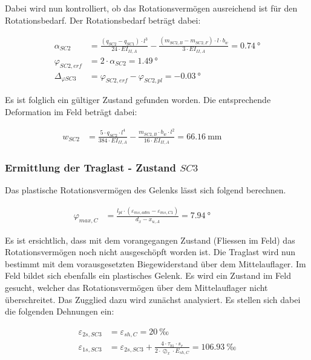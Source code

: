 \documentclass[
  11pt,
  letterpaper,
]{scrreprt}
\begin{document}
Dabei wird nun kontrolliert, ob das Rotationsvermögen ausreichend ist
für den Rotationsbedarf. Der Rotationsbedarf beträgt dabei:

\[
\begin{aligned}
\alpha_{SC2}& = \frac{\left(q_{SC2} - q_{SC1}\right) \cdot l^{3}}{24 \cdot EI_{II , A}} - \frac{\left(m_{SC2 , B} - m_{SC2 , F}\right) \cdot l \cdot b_{w}}{3 \cdot EI_{II , A}} = 0.74 \ \mathrm{°} \\ 
\varphi_{SC2 , erf}& = 2 \cdot \alpha_{SC2} = 1.49 \ \mathrm{°} \\ 
\Delta_{\varphi SC3}& = \varphi_{SC2 , erf} - \varphi_{SC2 , pl} = -0.03 \ \mathrm{°} \end{aligned}
\]

Es ist folglich ein gültiger Zustand gefunden worden. Die entsprechende
Deformation im Feld beträgt dabei:

\[
\begin{aligned}
w_{SC2}& = \frac{5 \cdot q_{SC2} \cdot l^{4}}{384 \cdot EI_{II , A}} - \frac{m_{SC2 , B} \cdot b_{w} \cdot l^{2}}{16 \cdot EI_{II , A}} = 66.16 \ \mathrm{mm} \quad &  \quad &  
 \end{aligned}
\]

\subsubsection{\texorpdfstring{Ermittlung der Traglast - Zustand
\(SC3\)}{Ermittlung der Traglast - Zustand SC3}}\label{ermittlung-der-traglast---zustand-sc3}

Das plastische Rotationsvermögen des Gelenks lässt sich folgend
berechnen.

\[
\begin{aligned}
\varphi_{max , C}& = \frac{l_{pl} \cdot \left(\varepsilon_{m s , adm} - \varepsilon_{m s , C1}\right)}{d_{x} - x_{u , A}} = 7.94 \ \mathrm{°} \quad &  \quad &  
 \end{aligned}
\]

Es ist ersichtlich, dass mit dem vorangegangen Zustand (Fliessen im
Feld) das Rotationsvermögen noch nicht ausgeschöpft worden ist. Die
Traglast wird nun bestimmt mit dem vorausgesetzten Biegewiderstand über
dem Mittelauflager. Im Feld bildet sich ebenfalls ein plastisches
Gelenk. Es wird ein Zustand im Feld gesucht, welcher das
Rotationsvermögen über dem Mittelauflager nicht überschreitet. Das
Zugglied dazu wird zunächst analysiert. Es stellen sich dabei die
folgenden Dehnungen ein:

\[
\begin{aligned}
\varepsilon_{2 s , SC3}& = \varepsilon_{sh , C} = 20 \ \mathrm{‰} \\ 
\varepsilon_{1 s , SC3}& = \varepsilon_{2 s , SC3} + \frac{4 \cdot \tau_{b1} \cdot s_{r}}{2 \cdot \oslash_{x} \cdot E_{sh , C}} = 106.93 \ \mathrm{‰} \end{aligned}
\]
\end{document}
